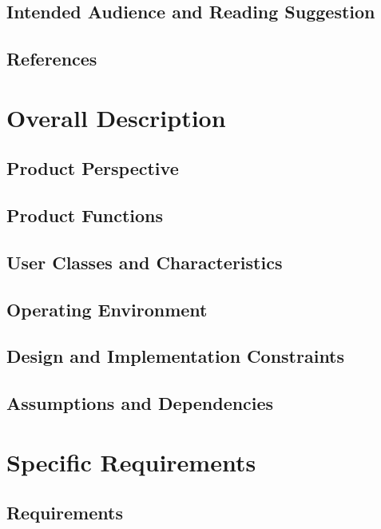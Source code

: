 \documentclass{article}
\begin{document}
\subsection{Intended Audience and Reading Suggestion}

\subsection{References}

\section{Overall Description}

\subsection{Product Perspective}

\subsection{Product Functions}

\subsection{User Classes and Characteristics}

\subsection{Operating Environment}

\subsection{Design and Implementation Constraints}

\subsection{Assumptions and Dependencies}

\section{Specific Requirements}

\subsection{Requirements}
\end{document}
